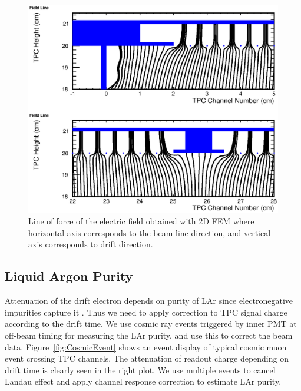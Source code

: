 
\begin{figure}[htbp]
 \begin{center}
  \includegraphics[width=1.0\hsize]{fig/FieldLine.eps}
 \end{center}
 \caption{Line of force of the electric field obtained with 
2D FEM where horizontal axis corresponds to the beam line direction,
and vertical axis corresponds to drift direction.
}
 \label{Fig:FieldLine}
\end{figure}

\subsection{Liquid Argon Purity}

Attenuation of the drift electron depends on purity of LAr since electronegative impurities capture it \cite{purity}. 
Thus we need to apply correction to TPC signal charge according to the drift time.
We use cosmic ray events triggered by inner PMT at off-beam timing for measuring the LAr purity, and use this to correct the beam data.
Figure~\ref{fig:CosmicEvent} shows an event display of typical cosmic muon event crossing TPC channels.
The attenuation of readout charge depending on drift time is clearly seen in the right plot. 
We use multiple events to cancel Landau effect and apply channel response correction to estimate LAr purity.

